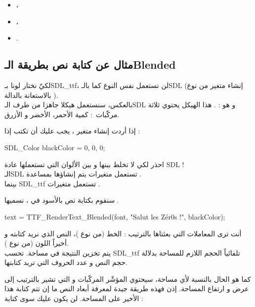 \begin{itemize}
	\item {}،
	\item {}،
	\item {}.
\end{itemize}

\subsection{مثال عن كتابة نص بطريقة الـ\textenglish{Blended}}

لكيّ نختار لونا بـ\textenglish{SDL\_ttf}،
لن نستعمل نفس النوع كما بالـ\textenglish{SDL}
(إنشاء متغير من نوع
بالاستعانة بالدالة
).\\
بالعكس، سنستعمل هيكلا جاهزا من طرف الـ\textenglish{SDL}
و هو : 
.
هذا الهيكل يحتوي ثلاثة مركّبات~: كمية الأحمر، الأخضر و الأزرق.

إذا أردت إنشاء متغير
،
يجب عليك أن تكتب إذا :

\begin{Csource}
SDL_Color blackColor = {0, 0, 0};
\end{Csource}

\begin{warning}
احذر لكي لا تخلط بينها و بين الألوان التي تستعملها عادة 
\textenglish{SDL} !\\
الـ\textenglish{SDL}
تستعمل متغيرات
يتم إنشاؤها بمساعدة 
.\\
بينما
\textenglish{SDL\_ttf}
تستعمل متغيرات
.
\end{warning}

سنقوم بكتابة نص بالأسود في
،
نسميها
.

\begin{Csource}
text = TTF_RenderText_Blended(font, "Salut les Zér0s !", blackColor);
\end{Csource}

أنت ترى  المعاملات التي بعثتاها بالترتيب : الخط (من نوع
)،
النص الذي نريد كتابته و أخيراً اللون (من نوع
).\\
يتم تخزين النتيجة في مساحة. تحسب
\textenglish{SDL\_ttf}
تلفائياً الحجم اللازم للمساحة بدلالة حجم النص و عدد الحروف التي تريد كتابتها.

كما هو الحال بالنسبة لأي مساحة، سيحتوي المؤشّر
المركّبات
و
التي تشير بالترتيب إلى عرض و ارتفاع المساحة. إذن فهذه طريقة جيدة لمعرفة أبعاد النص ما إن تتم كتابة هذا الأخير على المساحة. لن يكون عليك سوى كتابة :

